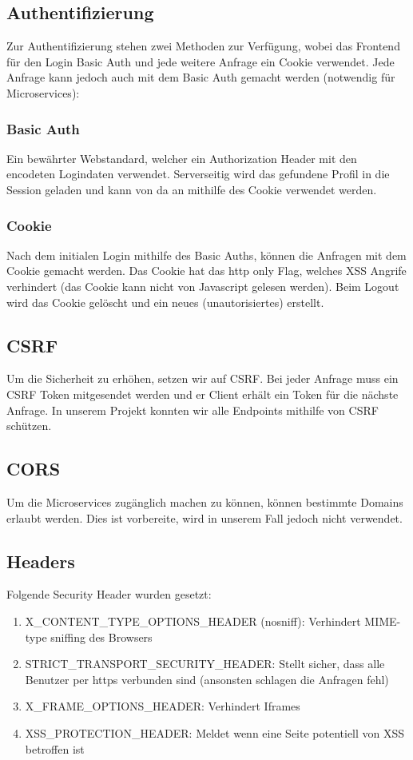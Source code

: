 \documentclass[11pt]{article} %
\begin{document}
\subsection{Authentifizierung}
Zur Authentifizierung stehen zwei Methoden zur Verfügung, wobei das Frontend für den Login Basic Auth und jede weitere Anfrage ein Cookie verwendet. Jede Anfrage kann jedoch auch mit dem Basic Auth gemacht werden (notwendig für Microservices):

\subsubsection{Basic Auth}
Ein bewährter Webstandard, welcher ein Authorization Header mit den encodeten Logindaten verwendet. Serverseitig wird das gefundene Profil in die Session geladen und kann von da an mithilfe des Cookie verwendet werden.

\subsubsection{Cookie}
Nach dem initialen Login mithilfe des Basic Auths, können die Anfragen mit dem Cookie gemacht werden. Das Cookie hat das http only Flag, welches XSS Angrife verhindert (das Cookie kann nicht von Javascript gelesen werden). Beim Logout wird das Cookie gelöscht und ein neues (unautorisiertes) erstellt.

\subsection{CSRF}
Um die Sicherheit zu erhöhen, setzen wir auf CSRF. Bei jeder Anfrage muss ein CSRF Token mitgesendet werden und er Client erhält ein Token für die nächste Anfrage. In unserem Projekt konnten wir alle Endpoints mithilfe von CSRF schützen.

\subsection{CORS}
Um die Microservices zugänglich machen zu können, können bestimmte Domains erlaubt werden. Dies ist vorbereite, wird in unserem Fall jedoch nicht verwendet.

\subsection{Headers}

Folgende Security Header wurden gesetzt:

\begin{enumerate}
\item X_CONTENT_TYPE_OPTIONS_HEADER (nosniff): Verhindert MIME-type sniffing des Browsers
\item STRICT_TRANSPORT_SECURITY_HEADER: Stellt sicher, dass alle Benutzer per https verbunden sind (ansonsten schlagen die Anfragen fehl)
\item X_FRAME_OPTIONS_HEADER: Verhindert Iframes
\item XSS_PROTECTION_HEADER: Meldet wenn eine Seite potentiell von XSS betroffen ist
\end{enumerate}
\end{document}
